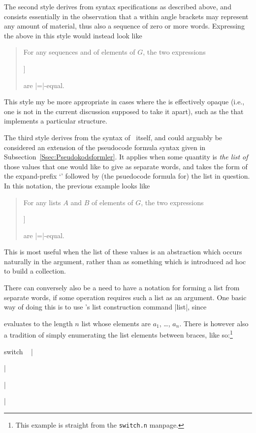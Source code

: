 \documentclass{mtmtcl}
\theoremstyle{plain}
\theoremstyle{remark}
\begin{document}
The second style derives from syntax specifications as described 
above, and consists essentially in the observation that a 
 within angle brackets may represent any amount of 
material, thus also a sequence of zero or more words. Expressing the 
above in this style would instead look like
\begin{quote}
  For any sequences  and  of elements of $G$, the 
  two expressions
  \begin{displaysyntax}
    \par
    [$G$ * [$G$ * \meta{A}] [$G$ * \meta{B}]]
  \end{displaysyntax}
  are |=|-equal.
\end{quote}
This style my be more appropriate in cases where the  is 
effectively opaque (i.e., one is not in the current discussion 
supposed to take it apart), such as the  that implements 
a particular structure.

The third style derives from the syntax of \Tcl\ itself, and could 
arguably be considered an extension of the pseudocode formula syntax 
given in Subsection~\ref{Ssec:Pseudokodsformler}. It applies when 
some quantity is \emph{the list of} those values that one would like 
to give as separate words, and takes the form of the expand-prefix 
`\splode' followed by (the psuedocode formula for) the list in 
question. In this notation, the previous example looks like
\begin{quote}
  For any lists $A$ and $B$ of elements of $G$, the two expressions
  \begin{displaysyntax}
    \par
    [$G$ * [$G$ * \splode$A$] [$G$ * \splode$B$]]
  \end{displaysyntax}
  are |=|-equal.
\end{quote}
This is most useful when the list of these values is an 
abstraction which occurs naturally in the argument, rather than 
as something which is introduced ad hoc to build a collection.

There can conversely also be a need to have a notation for forming a 
list from separate words, if some operation requires such a list as an 
argument. One basic way of doing this is to use \Tcl's list 
construction command |list|, since
\begin{displaysyntax}
\end{displaysyntax}
evaluates to the length $n$ list whose elements are $a_1$, \dots, 
$a_n$. There is however also a tradition of simply enumerating the 
list elements between braces, like so:\footnote{
  This example is straight from the \texttt{switch.n} manpage.
}
\begin{displaysyntax}
  switch \regopt\ 
  |{| \begin{regblock}[\regplus]   
  \end{regblock} |}|
\end{displaysyntax}
\end{document}
